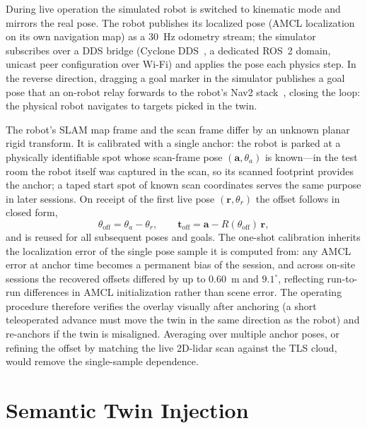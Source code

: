 During live operation the simulated robot is switched to kinematic mode and
mirrors the real pose. The robot publishes its localized pose (AMCL
localization~\cite{dellaert1999} on its own navigation map) as a 30~Hz
odometry stream; the simulator subscribes over a DDS bridge (Cyclone
DDS~\cite{cyclonedds}, a dedicated ROS~2 domain, unicast peer configuration
over Wi-Fi) and applies the pose each physics step. In the reverse direction,
dragging a goal marker in the simulator publishes a goal pose that an on-robot
relay forwards to the robot's Nav2 stack~\cite{macenski2020marathon}, closing
the loop: the physical robot navigates to targets picked in the twin.

The robot's SLAM map frame and the scan frame differ by an unknown planar rigid
transform. It is calibrated with a single anchor: the robot is parked at a
physically identifiable spot whose scan-frame pose $(\mathbf{a}, \theta_a)$ is
known---in the test room the robot itself was captured in the scan, so its
scanned footprint provides the anchor; a taped start spot of known scan
coordinates serves the same purpose in later sessions. On receipt of the first
live pose $(\mathbf{r}, \theta_r)$ the offset follows in closed form,
\begin{equation}
\theta_{\mathrm{off}} = \theta_a - \theta_r, \qquad
\mathbf{t}_{\mathrm{off}} = \mathbf{a} - R(\theta_{\mathrm{off}})\,\mathbf{r},
\label{eq:anchor}
\end{equation}
and is reused for all subsequent poses and goals. The one-shot calibration
inherits the localization error of the single pose sample it is computed from:
any AMCL error at anchor time becomes a permanent bias of the session, and
across on-site sessions the recovered offsets differed by up to 0.60~m and
$9.1^\circ$, reflecting run-to-run differences in AMCL initialization rather
than scene error. The operating procedure therefore verifies the overlay
visually after anchoring (a short teleoperated advance must move the twin in
the same direction as the robot) and re-anchors if the twin is misaligned.
Averaging over multiple anchor poses, or refining the offset by matching the
live 2D-lidar scan against the TLS cloud, would remove the single-sample
dependence.

\section{Semantic Twin Injection}
\label{sec:semantic-twin}

